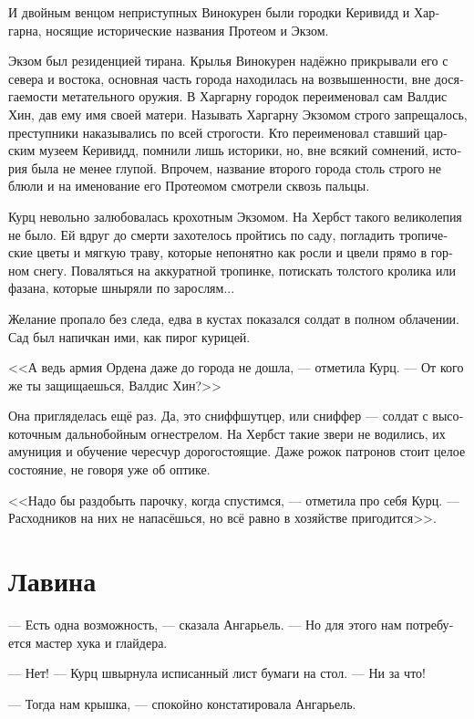 \documentclass[a4paper,12pt,fleqn]{book}\usepackage{polyglossia}\setdefaultlanguage[babelshorthands=true]{russian}\setotherlanguage{english}\defaultfontfeatures{Ligatures=TeX,Mapping=tex-text}\usepackage{xcolor}\newcommand{\ml}[3]{#2}
\newcommand{\asterism}{\vspace{1em}{\centering\Large\bfseries$\ast~\ast~\ast$\par}\vspace{1em}}
\begin{document}
И двойным венцом неприступных Винокурен были городки Керивидд и Харгарна, носящие исторические названия Протеом и Экзом.

Экзом был резиденцией тирана.
Крылья Винокурен надёжно прикрывали его с севера и востока, основная часть города находилась на возвышенности, вне досягаемости метательного оружия.
В Харгарну городок переименовал сам Валдис Хин, дав ему имя своей матери.
Называть Харгарну Экзомом строго запрещалось, преступники наказывались по всей строгости.
Кто переименовал ставший царским музеем Керивидд, помнили лишь историки, но, вне всякий сомнений, история была не менее глупой.
Впрочем, название второго города столь строго не блюли и на именование его Протеомом смотрели сквозь пальцы.

Курц невольно залюбовалась крохотным Экзомом.
На Хербст такого великолепия не было.
Ей вдруг до смерти захотелось пройтись по саду, погладить тропические цветы и мягкую траву, которые непонятно как росли и цвели прямо в горном снегу.
Поваляться на аккуратной тропинке, потискать толстого кролика или фазана, которые шныряли по зарослям...

Желание пропало без следа, едва в кустах показался солдат в полном облачении.
Сад был напичкан ими, как пирог курицей.

<<А ведь армия Ордена даже до города не дошла, --- отметила Курц.
--- От кого же ты защищаешься, Валдис Хин?>>

Она пригляделась ещё раз.
Да, это сниффшутцер, или сниффер --- солдат с высокоточным дальнобойным огнестрелом.
На Хербст такие звери не водились, их амуниция и обучение чересчур дорогостоящие.
Даже рожок патронов стоит целое состояние, не говоря уже об оптике.

<<Надо бы раздобыть парочку, когда спустимся, --- отметила про себя Курц.
--- Расходников на них не напасёшься, но всё равно в хозяйстве пригодится>>.

\section{Лавина}

--- Есть одна возможность, --- сказала Ангарьель.
--- Но для этого нам потребуется мастер хука и глайдера.

\asterism

--- Нет! --- Курц швырнула исписанный лист бумаги на стол.
--- Ни за что!

--- Тогда нам крышка, --- спокойно констатировала Ангарьель.
\end{document}
